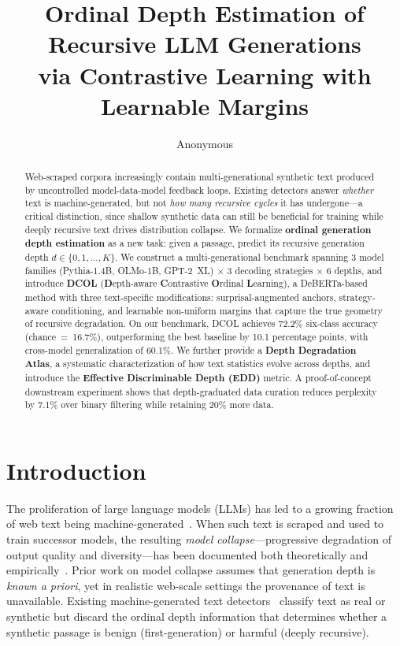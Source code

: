 \documentclass[11pt,a4paper]{article}
\title{Ordinal Depth Estimation of Recursive LLM Generations\\via Contrastive Learning with Learnable Margins}
\author{Anonymous}
\newcommand{\ours}{DCOL}
\newcommand{\atlas}{Atlas}
\begin{document}
\maketitle

\begin{abstract}
Web-scraped corpora increasingly contain multi-generational synthetic text produced by uncontrolled model-data-model feedback loops.
Existing detectors answer \emph{whether} text is machine-generated, but not \emph{how many recursive cycles} it has undergone---a critical distinction, since shallow synthetic data can still be beneficial for training while deeply recursive text drives distribution collapse.
We formalize \textbf{ordinal generation depth estimation} as a new task: given a passage, predict its recursive generation depth $d\!\in\!\{0,1,\ldots,K\}$.
We construct a multi-generational benchmark spanning 3 model families (Pythia-1.4B, OLMo-1B, GPT-2~XL) $\times$ 3 decoding strategies $\times$ 6 depths, and introduce \textbf{\ours{}} (\textbf{D}epth-aware \textbf{C}ontrastive \textbf{O}rdinal \textbf{L}earning), a DeBERTa-based method with three text-specific modifications: surprisal-augmented anchors, strategy-aware conditioning, and learnable non-uniform margins that capture the true geometry of recursive degradation.
On our benchmark, \ours{} achieves 72.2\% six-class accuracy (chance~=~16.7\%), outperforming the best baseline by 10.1 percentage points, with cross-model generalization of 60.1\%.
We further provide a \textbf{Depth Degradation \atlas{}}, a systematic characterization of how text statistics evolve across depths, and introduce the \textbf{Effective Discriminable Depth (EDD)} metric.
A proof-of-concept downstream experiment shows that depth-graduated data curation reduces perplexity by 7.1\% over binary filtering while retaining 20\% more data.
\end{abstract}

\section{Introduction}
\label{sec:intro}

The proliferation of large language models (LLMs) has led to a growing fraction of web text being machine-generated~\cite{shumailov2024ai}.
When such text is scraped and used to train successor models, the resulting \emph{model collapse}---progressive degradation of output quality and diversity---has been documented both theoretically and empirically~\cite{shumailov2024ai,dohmatob2024model,drayson2025investigating}.
Prior work on model collapse assumes that generation depth is \emph{known a priori}, yet in realistic web-scale settings the provenance of text is unavailable.
Existing machine-generated text detectors~\cite{mitchell2023detectgpt,hans2024binoculars,diveye2024} classify text as real or synthetic but discard the ordinal depth information that determines whether a synthetic passage is benign (first-generation) or harmful (deeply recursive).
\end{document}
